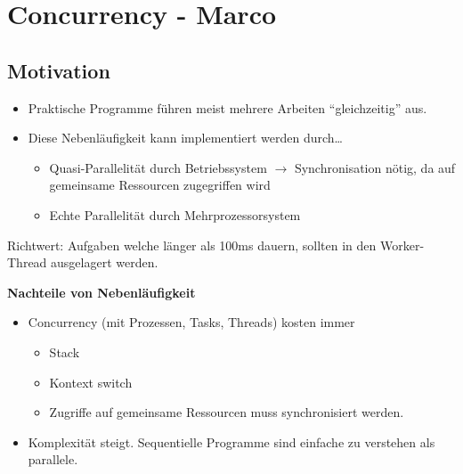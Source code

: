 \section{Concurrency - Marco }
\subsection{Motivation}
\begin{itemize}
  \item Praktische Programme führen meist mehrere Arbeiten "`gleichzeitig"' aus. 
  \item Diese Nebenläufigkeit kann implementiert werden durch\ldots
  \begin{itemize}
    \item Quasi-Parallelität durch Betriebssystem $\rightarrow$ Synchronisation
    nötig, da auf gemeinsame Ressourcen zugegriffen wird
    \item Echte Parallelität durch Mehrprozessorsystem
  \end{itemize}
\end{itemize}
Richtwert: Aufgaben welche länger als 100ms dauern, sollten in den Worker-Thread ausgelagert werden.

\textbf{Nachteile von Nebenläufigkeit}
\begin{itemize}
  \item  Concurrency (mit Prozessen, Tasks, Threads) kosten immer
  \begin{itemize}
    \item  Stack
    \item  Kontext switch
    \item  Zugriffe auf gemeinsame Ressourcen muss synchronisiert werden.
  \end{itemize}
  \item  Komplexität steigt. Sequentielle Programme sind einfache zu verstehen als parallele.
\end{itemize}

